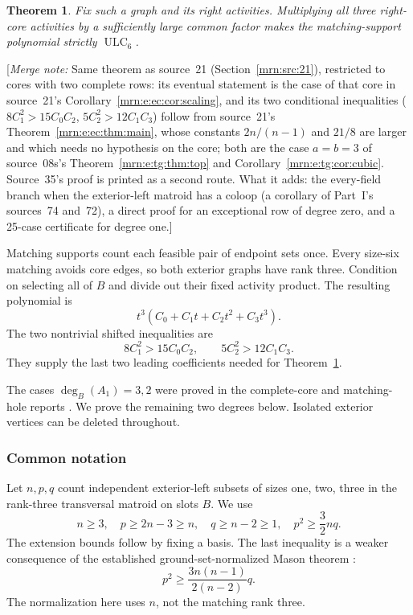 \documentclass[11pt,a4paper]{article}
\newtheorem{theorem}{Theorem}[section]
\theoremstyle{remark}\newtheorem{remark}[theorem]{Remark}
\newcommand{\ULC}{\operatorname{ULC}}      %
\newcommand{\mnote}[1]{[\textit{Merge note:} #1]}
\begin{document}
\begin{theorem}\label{mrn:e:tr:thm:main}
Fix such a graph and its right activities. Multiplying all three right-core activities by a sufficiently large common factor makes the matching-support polynomial strictly $\ULC_6$.
\end{theorem}
\mnote{Same theorem as source~21 (Section~\ref{mrn:src:21}), restricted to cores with two complete rows: its eventual statement is the case of that core in source~21's Corollary~\ref{mrn:e:ec:cor:scaling}, and its two conditional inequalities ($8C_1^2>15C_0C_2$, $5C_2^2>12C_1C_3$) follow from source~21's Theorem~\ref{mrn:e:ec:thm:main}, whose constants $2n/(n-1)$ and $21/8$ are larger and which needs no hypothesis on the core; both are the case $a=b=3$ of source~08s's Theorem~\ref{mrn:e:tg:thm:top} and Corollary~\ref{mrn:e:tg:cor:cubic}. Source~35's proof is printed as a second route. What it adds: the every-field branch when the exterior-left matroid has a coloop (a corollary of Part~I's sources~74 and~72), a direct proof for an exceptional row of degree zero, and a 25-case certificate for degree one.}

Matching supports count each feasible pair of endpoint sets once. Every size-six matching avoids core edges, so both exterior graphs have rank three. Condition on selecting all of $B$ and divide out their fixed activity product. The resulting polynomial is
\[
 t^3(C_0+C_1t+C_2t^2+C_3t^3).
\]
The two nontrivial shifted inequalities are
\begin{equation}\label{mrn:e:tr:eq:target}
 8C_1^2>15C_0C_2,\qquad 5C_2^2>12C_1C_3.
\end{equation}
They supply the last two leading coefficients needed for Theorem~\ref{mrn:e:tr:thm:main}.

The cases $\deg_B(A_1)=3,2$ were proved in the complete-core and matching-hole reports \cite{b:m43,b:m38}. We prove the remaining two degrees below. Isolated exterior vertices can be deleted throughout.

\subsubsection{Common notation}
Let $n,p,q$ count independent exterior-left subsets of sizes one, two, three in the rank-three transversal matroid on slots $B$. We use
\begin{equation}\label{mrn:e:tr:eq:basic}
 n\ge3,\quad p\ge2n-3\ge n,\quad q\ge n-2\ge1,\quad
 p^2\ge\frac32nq.
\end{equation}
The extension bounds follow by fixing a basis. The last inequality is a weaker consequence of the established ground-set-normalized Mason theorem \cite[Theorem 4.14]{b:BH}:
\begin{equation}\label{mrn:e:tr:eq:mason}
 p^2\ge\frac{3n(n-1)}{2(n-2)}q.
\end{equation}
The normalization here uses $n$, not the matching rank three.
\end{document}

